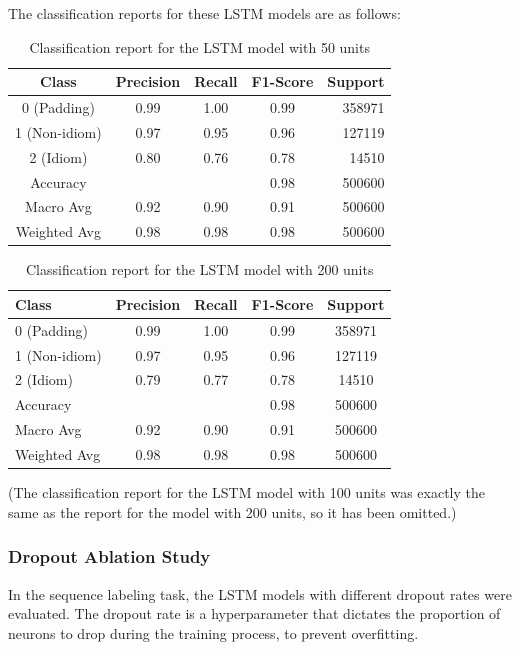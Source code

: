 \documentclass[conference]{IEEEtran}
\begin{document}
The classification reports for these LSTM models are as follows:
\begin{table}[ht]
\centering
\small
\caption{Classification report for the LSTM model with 50 units}
\begin{tabular}{ccccr}
\hline
Class & Precision & Recall & F1-Score & \multicolumn{1}{c}{Support} \\
\hline
0 (Padding) & 0.99 & 1.00 & 0.99 & 358971 \\
1 (Non-idiom) & 0.97 & 0.95 & 0.96 & 127119 \\
2 (Idiom) & 0.80 & 0.76 & 0.78 & 14510 \\
\hline
Accuracy & & & 0.98 & 500600 \\
Macro Avg & 0.92 & 0.90 & 0.91 & 500600 \\
Weighted Avg & 0.98 & 0.98 & 0.98 & 500600 \\
\hline
\end{tabular}
\label{tab:classification_report_lstm_50_units}
\end{table}

\begin{table}[ht]
\centering
\small
\caption{Classification report for the LSTM model with 200 units}
\begin{tabular}{lcccc}
\hline
Class & Precision & Recall & F1-Score & Support \\
\hline
0 (Padding) & 0.99 & 1.00 & 0.99 & 358971 \\
1 (Non-idiom) & 0.97 & 0.95 & 0.96 & 127119 \\
2 (Idiom) & 0.79 & 0.77 & 0.78 & 14510 \\
\hline
Accuracy & & & 0.98 & 500600 \\
Macro Avg & 0.92 & 0.90 & 0.91 & 500600 \\
Weighted Avg & 0.98 & 0.98 & 0.98 & 500600 \\
\hline
\end{tabular}
\label{tab:classification_report_lstm_200_units}
\end{table}

(The classification report for the LSTM model with 100 units was exactly the same as the report for the model with 200 units, so it has been omitted.)

\subsubsection{Dropout Ablation Study}
In the sequence labeling task, the LSTM models with different dropout rates were evaluated. The dropout rate is a hyperparameter that dictates the proportion of neurons to drop during the training process, to prevent overfitting.
\end{document}
